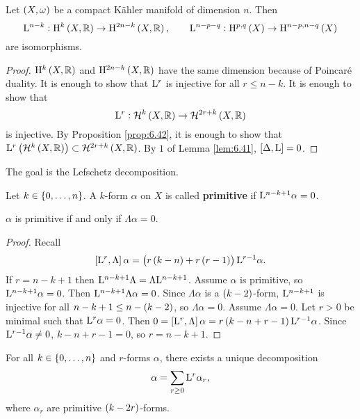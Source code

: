 \begin{theorem}
Let $ \br{X, \omega} $ be a compact K\"ahler manifold of dimension $ n $. Then
$$ \L^{n - k} : \H^k\br{X, \RR} \to \H^{2n - k}\br{X, \RR}, \qquad \L^{n - p - q} : \H^{p, q}\br{X} \to \H^{n - p, n - q}\br{X} $$
are isomorphisms.
\end{theorem}

\begin{proof}
$ \H^k\br{X, \RR} $ and $ \H^{2n - k}\br{X, \RR} $ have the same dimension because of Poincar\'e duality. It is enough to show that $ \mathrm{L}^r $ is injective for all $ r \le n - k $. It is enough to show that
$$ \L^r : \HHH^k\br{X, \RR} \to \HHH^{2r + k}\br{X, \RR} $$
is injective. By Proposition \ref{prop:6.42}, it is enough to show that $ \L^r\br{\HHH^k\br{X, \RR}} \subset \HHH^{2r + k}\br{X, \RR} $. By $ 1 $ of Lemma \ref{lem:6.41}, $ \sbr{\Delta, \L} = 0 $.
\end{proof}

The goal is the Lefschetz decomposition.

\begin{definition}
Let $ k \in \cbr{0, \dots, n} $. A $ k $-form $ \alpha $ on $ X $ is called \textbf{primitive} if $ \mathrm{L}^{n - k + 1}\alpha = 0 $.
\end{definition}

\begin{lemma}
\label{lem:6.45}
$ \alpha $ is primitive if and only if $ \Lambda\alpha = 0 $.
\end{lemma}

\begin{proof}
Recall
$$ \sbr{\L^r, \Lambda}\alpha = \br{r\br{k - n} + r\br{r - 1}}\L^{r - 1}\alpha. $$
If $ r = n - k + 1 $ then $ \mathrm{L}^{n - k + 1}\Lambda = \Lambda\mathrm{L}^{n - k + 1} $. Assume $ \alpha $ is primitive, so $ \mathrm{L}^{n - k + 1}\alpha = 0 $. Then $ \mathrm{L}^{n - k + 1}\Lambda\alpha = 0 $. Since $ \Lambda\alpha $ is a $ \br{k - 2} $-form, $ \mathrm{L}^{n - k + 1} $ is injective for all $ n - k + 1 \le n - \br{k - 2} $, so $ \Lambda\alpha = 0 $. Assume $ \Lambda\alpha = 0 $. Let $ r > 0 $ be minimal such that $ \mathrm{L}^r\alpha = 0 $. Then $ 0 = \sbr{\L^r, \Lambda}\alpha = r\br{k - n + r - 1}\L^{r - 1}\alpha $. Since $ \mathrm{L}^{r - 1}\alpha \ne 0 $, $ k - n + r - 1 = 0 $, so $ r = n - k + 1 $.
\end{proof}

\pagebreak

\begin{proposition}
For all $ k \in \cbr{0, \dots, n} $ and $ r $-forms $ \alpha $, there exists a unique decomposition
$$ \alpha = \sum_{r \ge 0} \mathrm{L}^r\alpha_r, $$
where $ \alpha_r $ are primitive $ \br{k - 2r} $-forms.
\end{proposition}

